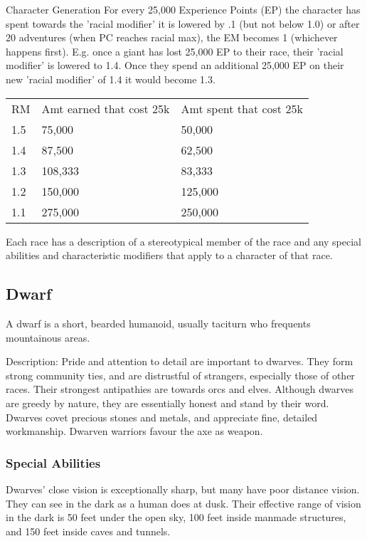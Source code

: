 \begin{Chapter}{Character Generation}
For every 25,000 Experience Points (EP) the character has spent
towards the 'racial modifier' it is lowered by .1 (but not below 1.0)
or after 20 adventures (when PC reaches racial max), the EM becomes 1
(whichever happens first).  E.g.  once a giant has lost 25,000 EP to
their race, their 'racial modifier' is lowered to 1.4.  Once they
spend an additional 25,000 EP on their new 'racial modifier' of 1.4 it
would become 1.3.

\begin{tabularx}{\columnwidth}{lXX}
RM	& Amt earned that cost 25k	& Amt spent that cost 25k  \\
1.5	& 75,000			& 50,000 \\
1.4	& 87,500			& 62,500 \\
1.3	& 108,333			& 83,333 \\
1.2	& 150,000			& 125,000 \\
1.1	& 275,000			& 250,000 \\
\end{tabularx}

Each race has a description of a stereotypical member of the race and
any special abilities and characteristic modifiers that apply to a
character of that race.

\subsection{Dwarf}

A dwarf is a short, bearded humanoid, usually taciturn who frequents
mountainous areas.

Description: Pride and attention to detail are important to dwarves.
They form strong community ties, and are distrustful of strangers,
especially those of other races. Their strongest antipathies are
towards orcs and elves.  Although dwarves are greedy by nature, they
are essentially honest and stand by their word. Dwarves covet precious
stones and metals, and appreciate fine, detailed workmanship.  Dwarven
warriors favour the axe as weapon.

\subsubsection{Special Abilities}

\begin{Enumerate}

\item Dwarves’ close vision is exceptionally sharp, but many have poor
  distance vision.  They can see in the dark as a human does at dusk.
  Their effective range of vision in the dark is 50 feet under the
  open sky, 100 feet inside manmade structures, and 150 feet inside
  caves and tunnels.


\end{Enumerate}
\end{Chapter}
